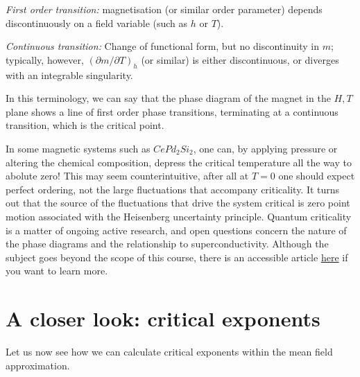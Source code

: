 \documentclass[
  letterpaper,
  enabledeprecatedfontcommands]{report}
\begin{document}
\emph{First order transition:} magnetisation (or similar order
parameter) depends discontinuously on a field variable (such as \(h\) or
\(T\)).

\emph{Continuous transition:} Change of functional form, but no
discontinuity in \(m\); typically, however,
\((\partial m/\partial T)_h\) (or similar) is either discontinuous, or
diverges with an integrable singularity.

In this terminology, we can say that the phase diagram of the magnet in
the \(H,T\) plane shows a line of first order phase transitions,
terminating at a continuous transition, which is the critical point.

\begin{tcolorbox}[enhanced jigsaw, leftrule=.75mm, bottomrule=.15mm, toprule=.15mm, colbacktitle=quarto-callout-caution-color!10!white, title=\textcolor{quarto-callout-caution-color}{\faFire}\hspace{0.5em}{Aside on Quantum Criticality}, breakable, titlerule=0mm, opacitybacktitle=0.6, colback=white, coltitle=black, colframe=quarto-callout-caution-color-frame, bottomtitle=1mm, rightrule=.15mm, toptitle=1mm, left=2mm, opacityback=0, arc=.35mm]

In some magnetic systems such as \(CePd_2Si_2\), one can, by applying
pressure or altering the chemical composition, depress the critical
temperature all the way to abolute zero! This may seem counterintuitive,
after all at \(T=0\) one should expect perfect ordering, not the large
fluctuations that accompany criticality. It turns out that the source of
the fluctuations that drive the system critical is zero point motion
associated with the Heisenberg uncertainty principle. Quantum
criticality is a matter of ongoing active research, and open questions
concern the nature of the phase diagrams and the relationship to
superconductivity. Although the subject goes beyond the scope of this
course, there is an accessible article
\href{https://arxiv.org/abs/1102.4628}{here} if you want to learn more.

\end{tcolorbox}

\section{A closer look: critical
exponents}\label{a-closer-look-critical-exponents}

Let us now see how we can calculate critical exponents within the mean
field approximation.
\end{document}

